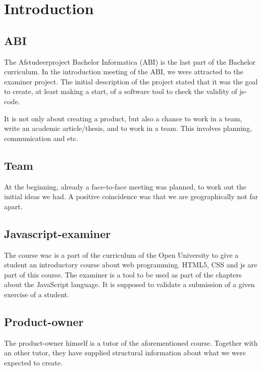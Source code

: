 \chapter{Introduction}



\section{ABI}

The Afstudeerproject Bachelor Informatica (ABI) is the last part of the Bachelor curriculum.
In the introduction meeting of the ABI, we were attracted to the \gls{examiner} project.
The initial description of the project stated that it was the goal to create,
at least making a start, of a software tool to check the validity
of \gls{js-code}.

It is not only about creating a product, but also a chance to work in a team, write an academic article/thesis, and to work in a team.
This involves planning, communication and etc.


\section{Team}
At the beginning, already a face-to-face meeting was planned, to work out the initial ideas we had.
A positive coincidence was that we are geographically not far apart.


\section{Javascript-examiner}
The course \gls{wac} is a part of the curriculum of the Open University to give
a student an introductory course about web programming.
HTML5, CSS and \gls{js} are part of this course.
The \gls{examiner} is a tool to be used as part of the chapters about the JavaScript language.
It is supposed to validate a submission of a given exercise of a student.


\section{Product-owner}

The product-owner himself is a tutor of the aforementioned course.
Together with an other tutor, they have supplied structural information about
what we were expected to create.


